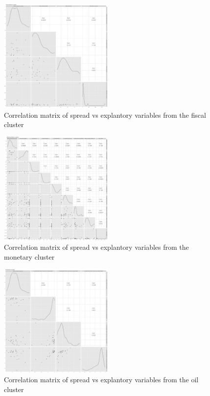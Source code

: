 \documentclass[11pt,]{article}
\begin{document}
\begin{figure}
\centering
\includegraphics[width=0.5\textwidth,height=\textheight]{reportfigures/Corrmatrix_spread_vs_fiscal.png}
\caption{Correlation matrix of spread vs explantory variables from the
fiscal cluster}
\end{figure}

\begin{figure}
\centering
\includegraphics[width=0.5\textwidth,height=\textheight]{reportfigures/Corrmatrix_spread_vs_monetary.png}
\caption{Correlation matrix of spread vs explantory variables from the
monetary cluster}
\end{figure}

\begin{figure}
\centering
\includegraphics[width=0.5\textwidth,height=\textheight]{reportfigures/Corrmatrix_spread_vs_oil.png}
\caption{Correlation matrix of spread vs explantory variables from the
oil cluster}
\end{figure}
\end{document}
